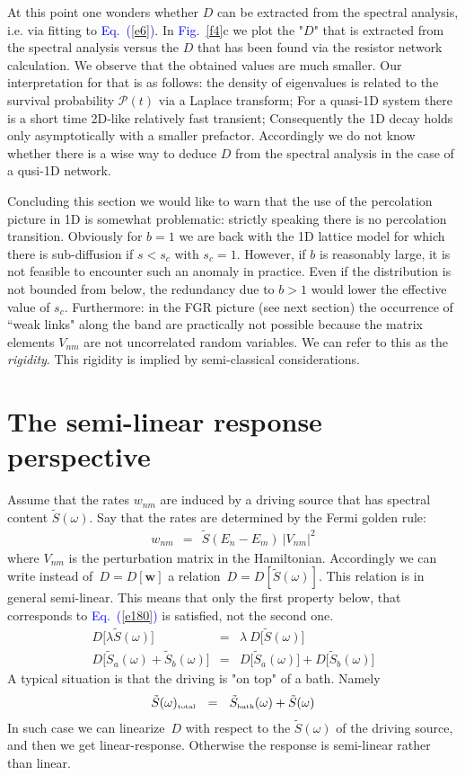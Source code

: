 \documentclass[onecolumn,fleqn,12pt,openany,draft]{book}
\newcommand{\tbox}[1]{\mbox{\tiny #1}}
\newcommand{\beq}{\begin{eqnarray}}
\newcommand{\eeq}{\end{eqnarray}}
\newcommand{\Eq}[1]{\textcolor{blue}{Eq.\!\!~(\ref{#1})}}
\newcommand{\Fig}[1]{\textcolor{blue}{Fig.}\!\!~\ref{#1}}
\begin{document}
At this point one wonders whether $D$ can be extracted 
from the spectral analysis, i.e. via fitting to \Eq{e6}.
In \Fig{f4}c we plot the "$D$" that is extracted 
from the spectral analysis versus the $D$ that  
has been found via the resistor network calculation.
We observe that the obtained values are much smaller.
Our interpretation for that is as follows: 
the density of eigenvalues is related to the survival 
probability $\mathcal{P}(t)$ via a Laplace transform;  
For a quasi-1D system there is a short time 2D-like 
relatively fast transient; Consequently the 1D decay 
holds only asymptotically with a smaller prefactor.  
Accordingly we do not know whether there is a wise 
way to deduce $D$ from the spectral analysis in the 
case of a qusi-1D network.

Concluding this section we would like to warn 
that the use of the percolation picture in 1D is 
somewhat problematic: strictly speaking  
there is no percolation transition. Obviously 
for ${b=1}$ we are back with the 1D lattice model 
for which there is sub-diffusion if ${s<s_c}$ 
with ${s_c=1}$. However, if $b$ is reasonably large, 
it is not feasible to encounter such an anomaly 
in practice. Even if the distribution is not bounded 
from below, the redundancy due to ${b>1}$ 
would lower the effective value of $s_c$. 
Furthermore: in the FGR picture (see next section) 
the occurrence of ``weak links" along the band  
are practically not possible because the matrix elements $V_{nm}$ 
are not uncorrelated random variables. 
We can refer to this as the {\em rigidity}.
This rigidity is implied by semi-classical considerations. 


\section{The semi-linear response perspective}

Assume that the rates $w_{nm}$ are induced 
by a driving source that has spectral content $\tilde{S}(\omega)$. 
Say that the rates are determined by the Fermi golden rule:
%
\beq
w_{nm} \ \ = \ \ \tilde{S}(E_n-E_m) \ |V_{nm}|^2
\eeq
%
where $V_{nm}$ is the perturbation matrix in the Hamiltonian.
Accordingly we can write instead of~$D=D[\bm{w}]$ 
a relation~$D=D[\tilde{S}(\omega)]$.
This relation is in general semi-linear. 
This means that only the first property below, 
that corresponds to \Eq{e180} is satisfied, 
not the second one.
%
\beq
D\big[ \lambda \tilde{S}(\omega)\big]  &=&   \lambda \ D\big[\tilde{S}(\omega)\big] 
\\
D\big[\tilde{S}_a(\omega) + \tilde{S}_b(\omega)\big]  &=&  D\big[\tilde{S}_a(\omega)\big] + D\big[\tilde{S}_b(\omega)\big]
\eeq
%
A typical situation is that the driving is "on top" of a bath. Namely 
%
\beq
\tilde{S}(\omega)_{\tbox{total}} \ \ = \ \ \tilde{S}_{\tbox{bath}}(\omega) + \tilde{S}(\omega)
\eeq  
%
In such case we can linearize~$D$ with respect to the $\tilde{S}(\omega)$  
of the driving source, and then we get linear-response. 
Otherwise the response is semi-linear rather than linear. 
\end{document}
